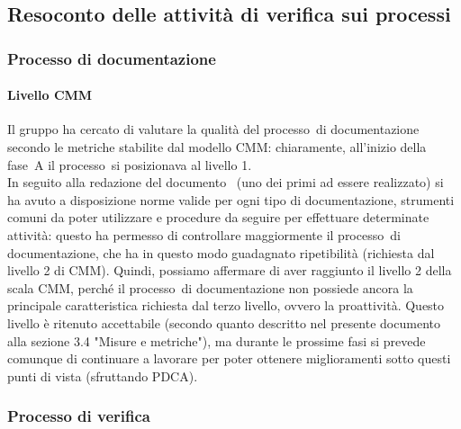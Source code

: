 \documentclass[../PianoDiQualifica.tex]{subfiles}
\begin{document}
\begin{appendices}
	\subsection{Resoconto delle attività di verifica sui processi}
		\subsubsection{Processo di documentazione}
			\paragraph{Livello CMM}
			Il gruppo ha cercato di valutare la qualità del processo\g\ di documentazione secondo le metriche stabilite dal modello CMM\g: chiaramente, all'inizio della fase\g\ A il processo\g\ 
si posizionava al livello 1.\\
			In seguito alla redazione del documento \normediprogetto\ (uno dei primi ad essere realizzato) si ha avuto a disposizione norme valide per ogni tipo di documentazione, strumenti comuni da poter utilizzare e procedure da seguire per effettuare determinate attività: questo ha permesso di controllare maggiormente il processo\g\ di documentazione, che ha in questo modo guadagnato ripetibilità (richiesta dal livello 2 di CMM\g).
			Quindi, possiamo affermare di aver raggiunto il livello 2 della scala CMM\g, perché il processo\g\ di documentazione non possiede ancora la principale caratteristica richiesta dal terzo livello, ovvero la proattività.
			Questo livello è ritenuto accettabile (secondo quanto descritto nel presente documento alla sezione 3.4 "Misure e metriche"), ma durante le prossime fasi si prevede comunque di continuare a lavorare per poter ottenere miglioramenti sotto questi punti di vista (sfruttando PDCA\g).
		\subsubsection{Processo di verifica}

\end{appendices}
\end{document}
